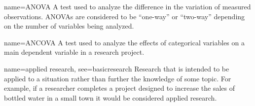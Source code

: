 









{name={ANOVA}}
{%
	A test used to analyze the difference in the variation of measured observations. ANOVAs are considered to be ``one-way'' or ``two-way'' depending on the number of variables being analyzed.
}

{name={ANCOVA}}
{%
	A test used to analyze the effects of categorical variables on a main dependent variable in a research project.
}

{name={applied research},
 see={basicresearch}}
{%
	Research that is intended to be applied to a situation rather than further the knowledge of some topic. For example, if a researcher completes a project designed to increase the sales of bottled water in a small town it would be considered applied research.
}


